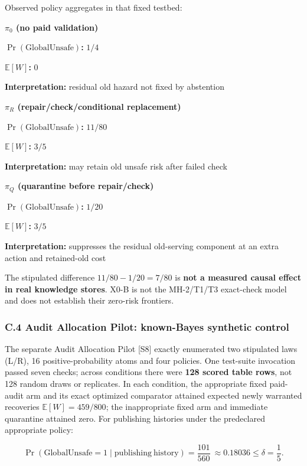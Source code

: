 \documentclass[
  10pt,
  american,
  a4paper,
]{article}
\begin{document}
Observed policy aggregates in that fixed testbed:

\textbf{\(\pi_0\) (no paid validation)}

\textbf{\(\Pr(\mathrm{GlobalUnsafe})\):} \(1/4\)

\textbf{\(\mathbb E[W]\):} \(0\)

\textbf{Interpretation:} residual old hazard not fixed by abstention

\textbf{\(\pi_R\) (repair/check/conditional replacement)}

\textbf{\(\Pr(\mathrm{GlobalUnsafe})\):} \(11/80\)

\textbf{\(\mathbb E[W]\):} \(3/5\)

\textbf{Interpretation:} may retain old unsafe risk after failed check

\textbf{\(\pi_Q\) (quarantine before repair/check)}

\textbf{\(\Pr(\mathrm{GlobalUnsafe})\):} \(1/20\)

\textbf{\(\mathbb E[W]\):} \(3/5\)

\textbf{Interpretation:} suppresses the residual old-serving component
at an extra action and retained-old cost

The stipulated difference \(11/80-1/20=7/80\) is \textbf{not a measured
causal effect in real knowledge stores}. X0-B is not the MH-2/T1/T3
exact-check model and does not establish their zero-risk frontiers.

\hypertarget{c.4-audit-allocation-pilot-known-bayes-synthetic-control}{%
\subsubsection{C.4 Audit Allocation Pilot: known-Bayes synthetic
control}\label{c.4-audit-allocation-pilot-known-bayes-synthetic-control}}

The separate Audit Allocation Pilot {[}S8{]} exactly enumerated two
stipulated laws (L/R), 16 positive-probability atoms and four policies.
One test-suite invocation passed seven checks; across conditions there
were \textbf{128 scored table rows}, not 128 random draws or replicates.
In each condition, the appropriate fixed paid-audit arm and its exact
optimized comparator attained expected newly warranted recoveries
\(\mathbb E[W]=459/800\); the inappropriate fixed arm and immediate
quarantine attained zero. For publishing histories under the predeclared
appropriate policy:

\[
\Pr(\mathrm{GlobalUnsafe}=1\mid\mathrm{publishing\ history})
   =\frac{101}{560}\ \approx0.18036\le\delta=\frac15.
\]
\end{document}
